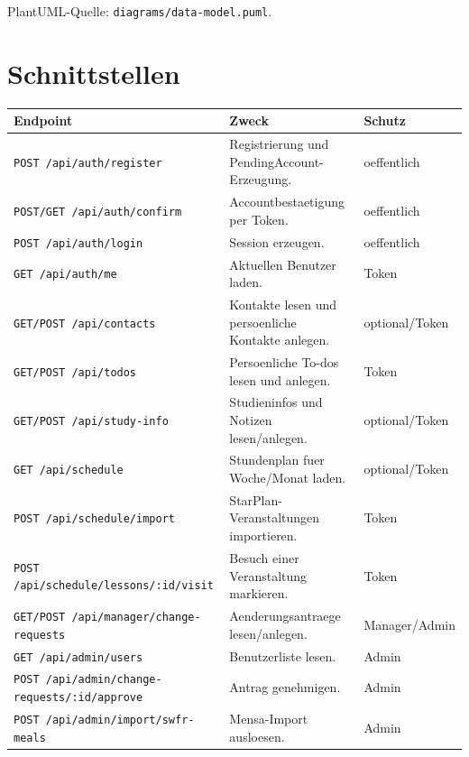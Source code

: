 \documentclass[11pt,a4paper]{article}
\begin{document}
PlantUML-Quelle: \texttt{diagrams/data-model.puml}.

\section{Schnittstellen}
\begin{longtable}{@{}p{45mm}p{82mm}p{22mm}@{}}
\toprule
Endpoint & Zweck & Schutz\\
\midrule
\endhead
\texttt{POST /api/auth/register} & Registrierung und PendingAccount-Erzeugung. & oeffentlich\\
\texttt{POST/GET /api/auth/confirm} & Accountbestaetigung per Token. & oeffentlich\\
\texttt{POST /api/auth/login} & Session erzeugen. & oeffentlich\\
\texttt{GET /api/auth/me} & Aktuellen Benutzer laden. & Token\\
\texttt{GET/POST /api/contacts} & Kontakte lesen und persoenliche Kontakte anlegen. & optional/Token\\
\texttt{GET/POST /api/todos} & Persoenliche To-dos lesen und anlegen. & Token\\
\texttt{GET/POST /api/study-info} & Studieninfos und Notizen lesen/anlegen. & optional/Token\\
\texttt{GET /api/schedule} & Stundenplan fuer Woche/Monat laden. & optional/Token\\
\texttt{POST /api/schedule/import} & StarPlan-Veranstaltungen importieren. & Token\\
\texttt{POST /api/schedule/lessons/:id/visit} & Besuch einer Veranstaltung markieren. & Token\\
\texttt{GET/POST /api/manager/change-requests} & Aenderungsantraege lesen/anlegen. & Manager/Admin\\
\texttt{GET /api/admin/users} & Benutzerliste lesen. & Admin\\
\texttt{POST /api/admin/change-requests/:id/approve} & Antrag genehmigen. & Admin\\
\texttt{POST /api/admin/import/swfr-meals} & Mensa-Import ausloesen. & Admin\\
\bottomrule
\end{longtable}
\end{document}
